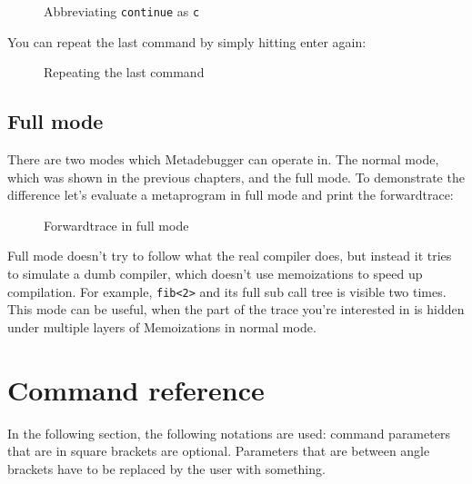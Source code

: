 \begin{figure}[H]
    
    \caption{Abbreviating \texttt{continue} as \texttt{c}}
\end{figure}

\noindent
You can repeat the last command by simply hitting enter again:

\begin{figure}[H]
    
    \caption{Repeating the last command}
\end{figure}

\subsection{Full mode}

There are two modes which Metadebugger can operate in. The normal mode, which
was shown in the previous chapters, and the full mode. To demonstrate the
difference let's evaluate a metaprogram in full mode and print the
forwardtrace:

\begin{figure}[H]
    
    \caption{Forwardtrace in full mode}
\end{figure}

Full mode doesn't try to follow what the real compiler does, but instead it
tries to simulate a dumb compiler, which doesn't use memoizations to speed up
compilation. For example, \texttt{fib<2>} and its full sub call tree is
visible two times. This mode can be useful, when the part of the trace you're
interested in is hidden under multiple layers of Memoizations in normal mode.

\section{Command reference}

In the following section, the following notations are used: command parameters
that are in square brackets are optional. Parameters that are between angle
brackets have to be replaced by the user with something.



